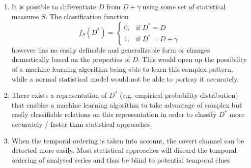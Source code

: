 \documentclass[12pt,a4paper,automark, toc=bib]{scrreprt}
\theoremstyle{definition}
\begin{document}
			\begin{enumerate}
				\item It is possible to differentiate $D$ from $D + \gamma$ using some set of statistical measures $S$. The classification function 
				\begin{equation}
					f_S(D^*)=\begin{cases}
						0,				& \text{if } D^* = D\\
						1,              & \text{if } D^* = D + \gamma
					\end{cases}
				\end{equation}
				however has no easily definable and generalizable form or changes dramatically based on the properties of $D$. This would open up the possibility of a machine learning algorithm being able to learn this complex pattern, while a normal statistical model would not be able to portray it accurately.
				\item There exists a representation of $D^*$ (e.g. empirical probability distribution) that enables a machine learning algorithm to take advantage of complex but easily classifiable relations on this representation in order to classify $D^*$ more accurately / faster than statistical approaches.
				\item When the temporal ordering is taken into account, the covert channel can be detected more easily. Most statistical approaches will discard the temporal ordering of analysed series and thus be blind to potential temporal clues
			\end{enumerate}
			
\end{document}
